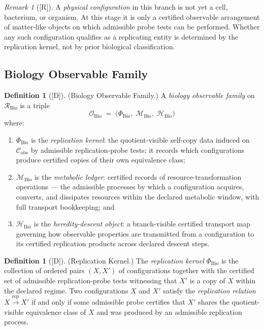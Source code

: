 \documentclass[12pt,oneside]{amsbook}
\theoremstyle{plain}
\theoremstyle{definition}
\newtheorem{definition}[theorem]{Definition}
\theoremstyle{remark}
\newtheorem{remark}[theorem]{Remark}
\newcommand{\status}[1]{\textup{[#1]}}
\begin{document}
\begin{remark}[\status{R}]\label{rem:bio-config-note}
A \emph{physical configuration} in this branch is not yet a cell,
bacterium, or organism. At this stage it is only a certified
observable arrangement of matter-like objects on which admissible
probe tests can be performed. Whether any such configuration
qualifies as a replicating entity is determined by the replication
kernel, not by prior biological classification.
\end{remark}

\subsection{Biology Observable Family}\label{sec:bio-obs-family}

\begin{definition}[\status{D}]\label{def:bio-obs-family}
\textup{(Biology Observable Family.)}
A \emph{biology observable family} on $\mathcal{R}_{\mathrm{Bio}}$
is a triple
\[
 \mathcal{O}_{\mathrm{Bio}} \;=\;
 \bigl(\Phi_{\mathrm{Bio}},\;
 \mathcal{M}_{\mathrm{Bio}},\;
 \mathcal{H}_{\mathrm{Bio}}\bigr)
\]
where:
\begin{enumerate}[label=\textup{(\arabic*)}]
 \item $\Phi_{\mathrm{Bio}}$ is the \emph{replication kernel}: the
 quotient-visible self-copy data induced on $\mathcal{C}_{\mathrm{obs}}$
 by admissible replication-probe tests; it records which
 configurations produce certified copies of their own equivalence
 class;
 \item $\mathcal{M}_{\mathrm{Bio}}$ is the \emph{metabolic ledger}:
 certified records of resource-transformation operations --- the
 admissible processes by which a configuration acquires, converts,
 and dissipates resources within the declared metabolic window,
 with full transport bookkeeping; and
 \item $\mathcal{H}_{\mathrm{Bio}}$ is the \emph{heredity-descent
 object}: a branch-visible certified transport map governing how
 observable properties are transmitted from a configuration to its
 certified replication products across declared descent steps.
\end{enumerate}
\end{definition}

\begin{definition}[\status{D}]\label{def:bio-replication-kernel}
\textup{(Replication Kernel.)}
The \emph{replication kernel} $\Phi_{\mathrm{Bio}}$ is the collection
of ordered pairs $(X, X')$ of configurations together with the
certified set of admissible replication-probe tests witnessing that
$X'$ is a copy of $X$ within the declared regime. Two configurations
$X$ and $X'$ satisfy the \emph{replication relation}
$X \xrightarrow{\mathrm{rep}} X'$ if and only if some admissible
probe certifies that $X'$ shares the quotient-visible equivalence
class of $X$ and was produced by an admissible replication process.
\end{definition}
\end{document}
